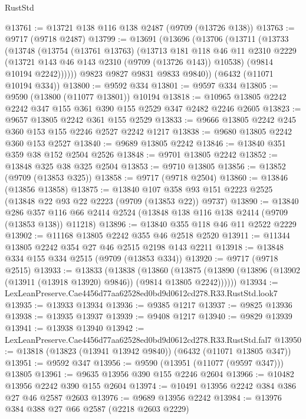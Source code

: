 \begin{lexlean}{RustStd}
\begin{coremodule}
@13761 := @13721 @138 @116 @138 @2487 (@9709 (@13726 @138))
@13763 := @9717 (@9718 @2487)
@13799 := @13691
    (@13696
      (@13706
        (@13711
          (@13733
            (@13748
              (@13754
                (@13761 @13763)
                (@13713
                  @181
                  @118
                  @46
                  @11
                  @2310
                  @2229
                  (@13721 @143 @46 @143 @2310 (@9709 (@13726 @143)) @10538)
                  (@9814 @10194 @2242))))))
        @9823
        @9827
        @9831
        @9833
        @9840))
    (@6432 (@11071 @10194 @334))
@13800 := @9592 @334
@13801 := @9597 @334
@13805 := @9590 (@13800 (@11077 @13801)) @10194
@13818 := @10965 @13805 @2242 @2242 @347 @155 @361 @390 @155 @2529 @347 @2482 @2246 @2605
@13823 := @9657 @13805 @2242 @361 @155 @2529
@13833 := @9666 @13805 @2242 @245 @360 @153 @155 @2246 @2527 @2242 @1217
@13838 := @9680 @13805 @2242 @360 @153 @2527
@13840 := @9689 @13805 @2242
@13846 := @13840 @351 @359 @38 @152 @2504 @2526
@13848 := @9701 @13805 @2242
@13852 := @13848 @325 @38 @325 @2504
@13853 := @9710 @13805
@13856 := @13852 (@9709 (@13853 @325))
@13858 := @9717 (@9718 @2504)
@13860 := @13846 (@13856 @13858)
@13875 := @13840
    @107
    @358
    @93
    @151
    @2223
    @2525
    (@13848 @22 @93 @22 @2223 (@9709 (@13853 @22)) @9737)
@13890 := @13840
    @286
    @357
    @116
    @66
    @2414
    @2524
    (@13848 @138 @116 @138 @2414 (@9709 (@13853 @138)) @11218)
@13896 := @13840 @355 @118 @46 @11 @2522 @2229
@13902 := @11168 @13805 @2242 @355 @46 @2518 @2520
@13911 := @11344 @13805 @2242 @354 @27 @46 @2515 @2198 @143 @2211
@13918 := @13848 @334 @155 @334 @2515 (@9709 (@13853 @334))
@13920 := @9717 (@9718 @2515)
@13933 := @13833
    (@13838
      (@13860
        (@13875 (@13890 (@13896 (@13902 (@13911 (@13918 @13920) @9846)) (@9814 @13805 @2242))))))
@13934 := LexLeanPreserve.Cae4456d77aa62528ed0bd9d0612cd278.R33.RustStd.look7
@13935 := @13933 @13934
@13936 := @9385 @1217
@13937 := @9825 @13936
@13938 := @13935 @13937
@13939 := @9408 @1217
@13940 := @9829 @13939
@13941 := @13938 @13940
@13942 := LexLeanPreserve.Cae4456d77aa62528ed0bd9d0612cd278.R33.RustStd.fal7
@13950 := @13818 (@13823 (@13941 @13942 @9840)) (@6432 (@11071 @13805 @347))
@13951 := @9592 @347
@13956 := @9590 (@13951 (@11077 (@9597 @347))) @13805
@13961 := @9635 @13956 @390 @155 @2246 @2604
@13966 := @10482 @13956 @2242 @390 @155 @2604
@13974 := @10491 @13956 @2242 @384 @386 @27 @46 @2587 @2603
@13976 := @9689 @13956 @2242
@13984 := @13976 @384 @388 @27 @66 @2587 (@2218 @2603 @2229)

\end{coremodule}
\end{lexlean}

